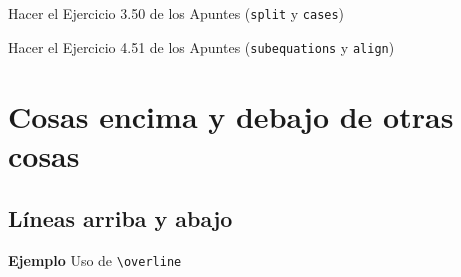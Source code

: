 \documentclass[11pt,a4paper]{report}
\begin{document}
\bigskip





\bigskip
 Hacer el Ejercicio 3.50 de los Apuntes 
(\texttt{split} y \texttt{cases})


\bigskip





\bigskip
 Hacer el Ejercicio 4.51 de los Apuntes
(\texttt{subequations} y \texttt{align})


\bigskip





\section{Cosas encima y debajo de otras cosas}





\subsection{Líneas arriba y abajo}





\bigskip
\textbf{Ejemplo} Uso de \texttt{\textbackslash{}overline}

\begin{equation*}
\end{equation*}

\bigskip
\end{document}
